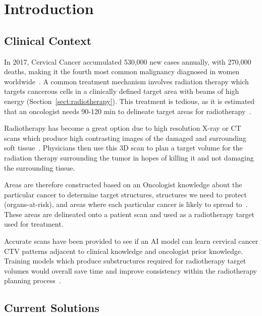 \documentclass[11pt,twoside]{report}
\begin{document}
\chapter{Introduction}\label{sect:intro}

\setcounter{page}{1}
\fancyhead[LE,RO]{\slshape \rightmark}
\fancyhead[LO,RE]{\slshape \leftmark}

\section{Clinical Context}

In 2017, Cervical Cancer accumulated 530,000 new cases annually, with 270,000 deaths, making it the fourth most common malignancy diagnosed in women worldwide~\cite{cervical-cancer-epidemic}. A common treatment mechanism involves radiation therapy which targets cancerous cells in a clinically defined target area with beams of high energy (Section~\ref{sect:radiotherapy}). This treatment is tedious, as it is estimated that an oncologist needs 90-120 min to delineate target areas for radiotherapy~\cite{LIU2020184}.

Radiotherapy has become a great option due to high resolution X-ray or CT scans which produce high contrasting images of the damaged and surrounding soft tissue~\cite{radiotherapy-basic-concepts}. Physicians then use this 3D scan to plan a target volume for the radiation therapy surrounding the tumor in hopes of killing it and not damaging the surrounding tissue.

Areas are therefore constructed based on an Oncologist knowledge about the particular cancer to determine target structures, structures we need to protect (organs-at-risk), and areas where each particular cancer is likely to spread to~\cite{AMLART-data}. These areas are delineated onto a patient scan and used as a radiotherapy target used for treatment.

Accurate scans have been provided to see if an AI model can learn cervical cancer CTV patterns adjacent to clinical knowledge and oncologist prior knowledge. Training models which produce substructures required for radiotherapy target volumes would overall save time and improve consistency within the radiotherapy planning process~\cite{AMLART-data}.

\section{Current Solutions}\label{sect:current-solutions}
\end{document}
